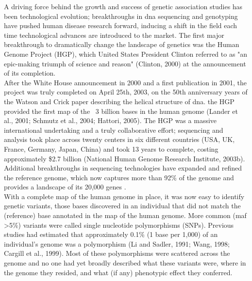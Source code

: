 \cite{lander2001initial}

A driving force behind the growth and success of genetic association studies has been technological evolution; breakthroughs in \gls{dna} sequencing and genotyping have pushed human disease research forward, inducing a shift in the field each time technological
advances are introduced to the market. 
The first major breakthrough to dramatically change the landscape of genetics was the Human Genome Project (HGP), which United States President Clinton referred to as "an epic-making triumph of science and reason" (Clinton, 2000) at the announcement of its completion.\\

After the White House announcement in 2000 and a first publication in 2001, the 
project was truly completed on April 25th, 2003, on the 50th anniversary years of the Watson and Crick paper describing the helical structure of \gls{dna}.
the HGP provided the first map of the ~3 billion bases in the human genome (Lander et al., 2001; Schmutz et al., 2004; Hattori, 2005). 
The HGP was a massive international undertaking and a truly collaborative effort; sequencing and analysis took place across twenty centers in six different countries (USA, UK, France, Germany, Japan, China) and took 13 years to complete, costing approximately \$2.7 billion (National Human Genome Research Institute, 2003b).\\ 

Additional breakthroughs in sequencing technologies have expanded and refined the reference genome, which now captures more than 92\% of the genome and provides a landscape of its 20,000 genes \cite{lander2001initial}.\\

With a complete map of the human genome in place, it was now easy to identify genetic variants, those bases discovered in an individual that did not match the (reference) base annotated in the map of the human genome. 
More common (\gls{maf} >5\%) variants were called single nucleotide polymorphisms (SNPs). 
Previous studies had estimated that approximately 0.1\% (1 base per 1,000) of an individual's genome was a polymorphism (Li and Sadler, 1991; Wang, 1998; Cargill et al., 1999). 
Most of these polymorphisms were scattered across the genome and no one had yet broadly described what these variants were, where in the genome they resided, and what (if any) phenotypic effect they conferred.\\

